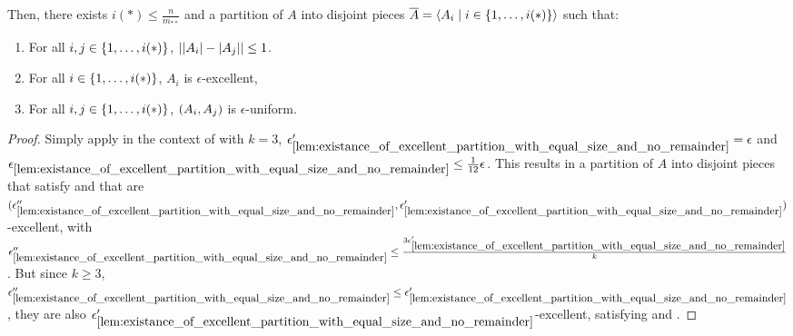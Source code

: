 \begin{lemma}[Corollary 5.15]
        Then, there exists $i(*) \leq \frac{n}{m_{**}}$ and a partition of $A$ into disjoint pieces
        $\overline{A} = \left< A_i \mid i \in \{ 1, \dots, i(*) \} \right>$ such that:
        \begin{enumerate}[label=(\roman*), ref=\roman*]
            \item \label{itm:resume_of_all_conditions_for_excellent_partitions.i} For all $i, j \in \{ 1, \dots, i(*) \}$, $| | A_i |- | A_j | | \leq 1$.
            \item \label{itm:resume_of_all_conditions_for_excellent_partitions.ii} For all $i \in \{ 1, \dots, i(*) \}$, $A_i$ is $\epsilon$-excellent,
            \item \label{itm:resume_of_all_conditions_for_excellent_partitions.iii} For all $i, j \in \{ 1, \dots, i(*) \}$, $( A_i, A_j )$ is $\epsilon$-uniform.
        \end{enumerate}
        \begin{proof}
            Simply apply  in the context of
             with $k = 3$,
            ${\epsilon'_{\ref{lem:existance_of_excellent_partition_with_equal_size_and_no_remainder}}} = \epsilon$
            and ${\epsilon_{\ref{lem:existance_of_excellent_partition_with_equal_size_and_no_remainder}}} \leq \frac{1}{12} \epsilon$.
            This results in a partition of $A$ into disjoint pieces that satisfy
             and that are
            $( {\epsilon''_{\ref{lem:existance_of_excellent_partition_with_equal_size_and_no_remainder}}},
                \epsilon'_{\ref{lem:existance_of_excellent_partition_with_equal_size_and_no_remainder}} )$-excellent,
            with ${\epsilon''_{\ref{lem:existance_of_excellent_partition_with_equal_size_and_no_remainder}}} \leq
                \frac{3 \epsilon'_{\ref{lem:existance_of_excellent_partition_with_equal_size_and_no_remainder}}}{k}$.
            But since $k \geq 3$, ${\epsilon''_{\ref{lem:existance_of_excellent_partition_with_equal_size_and_no_remainder}}} \leq
                \epsilon'_{\ref{lem:existance_of_excellent_partition_with_equal_size_and_no_remainder}}$, they are also
            $\epsilon'_{\ref{lem:existance_of_excellent_partition_with_equal_size_and_no_remainder}}$-excellent, satisfying
             and
            .
        \end{proof}
    \end{lemma}

